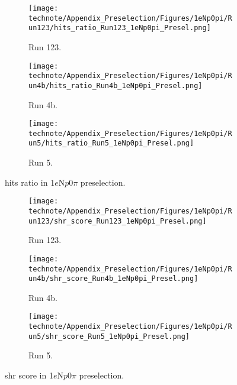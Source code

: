 \begin{figure}[H]
    \centering
    \begin{subfigure}[t]{0.32\linewidth}
        \texttt{[image: technote/Appendix\_Preselection/Figures/1eNp0pi/Run123/hits\_ratio\_Run123\_1eNp0pi\_Presel.png]}
        \caption{Run 123.}
    \end{subfigure}%
    \hspace{0.2cm}%
    \begin{subfigure}[t]{0.32\linewidth}
        \texttt{[image: technote/Appendix\_Preselection/Figures/1eNp0pi/Run4b/hits\_ratio\_Run4b\_1eNp0pi\_Presel.png]}
        \caption{Run 4b.}
    \end{subfigure}%
    \hspace{0.2cm}%
    \begin{subfigure}[t]{0.32\linewidth}
        \texttt{[image: technote/Appendix\_Preselection/Figures/1eNp0pi/Run5/hits\_ratio\_Run5\_1eNp0pi\_Presel.png]}
        \caption{Run 5.}
    \end{subfigure}
    \caption{hits ratio in 1$e$N$p$0$\pi$ preselection.}
\end{figure}

\begin{figure}[H]
    \centering
    \begin{subfigure}[t]{0.32\linewidth}
        \texttt{[image: technote/Appendix\_Preselection/Figures/1eNp0pi/Run123/shr\_score\_Run123\_1eNp0pi\_Presel.png]}
        \caption{Run 123.}
    \end{subfigure}%
    \hspace{0.2cm}%
    \begin{subfigure}[t]{0.32\linewidth}
        \texttt{[image: technote/Appendix\_Preselection/Figures/1eNp0pi/Run4b/shr\_score\_Run4b\_1eNp0pi\_Presel.png]}
        \caption{Run 4b.}
    \end{subfigure}%
    \hspace{0.2cm}%
    \begin{subfigure}[t]{0.32\linewidth}
        \texttt{[image: technote/Appendix\_Preselection/Figures/1eNp0pi/Run5/shr\_score\_Run5\_1eNp0pi\_Presel.png]}
        \caption{Run 5.}
    \end{subfigure}
    \caption{shr score in 1$e$N$p$0$\pi$ preselection.}
\end{figure}


